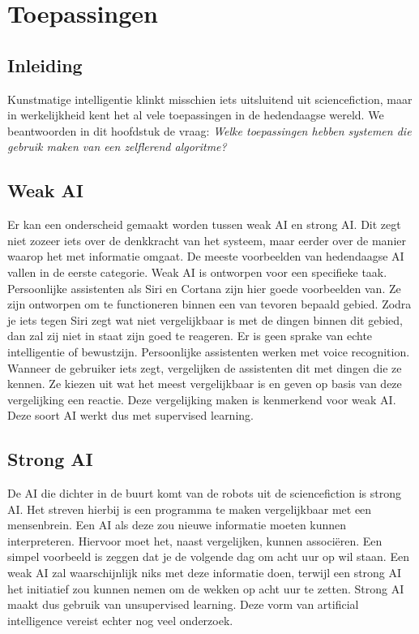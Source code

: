 \section{Toepassingen}

\subsection{Inleiding}
Kunstmatige intelligentie klinkt misschien iets uitsluitend uit sciencefiction, maar in werkelijkheid kent het al vele toepassingen in de hedendaagse wereld. We beantwoorden in dit hoofdstuk de vraag: \textit{Welke toepassingen hebben systemen die gebruik maken van een zelflerend algoritme?}

\subsection{Weak AI}
Er kan een onderscheid gemaakt worden tussen weak AI en strong AI. Dit zegt niet zozeer iets over de denkkracht van het systeem, maar eerder over de manier waarop het met informatie omgaat.
De meeste voorbeelden van hedendaagse AI vallen in de eerste categorie. Weak AI is ontworpen voor een specifieke taak. Persoonlijke assistenten als Siri en Cortana zijn hier goede voorbeelden van. Ze zijn ontworpen om te functioneren binnen een van tevoren bepaald gebied. Zodra je iets tegen Siri zegt wat niet vergelijkbaar is met de dingen binnen dit gebied, dan zal zij niet in staat zijn goed te reageren. Er is geen sprake van echte intelligentie of bewustzijn.
Persoonlijke assistenten werken met voice recognition. Wanneer de gebruiker iets zegt, vergelijken de assistenten dit met dingen die ze kennen. Ze kiezen uit wat het meest vergelijkbaar is en geven op basis van deze vergelijking een reactie. Deze vergelijking maken is kenmerkend voor weak AI. Deze soort AI werkt dus met supervised learning.

\subsection{Strong AI}
De AI die dichter in de buurt komt van de robots uit de sciencefiction is strong AI. Het streven hierbij is een programma te maken vergelijkbaar met een mensenbrein. \cite{Searle} Een AI als deze zou nieuwe informatie moeten kunnen interpreteren. Hiervoor moet het, naast vergelijken, kunnen associëren. Een simpel voorbeeld is zeggen dat je de volgende dag om acht uur op wil staan. Een weak AI zal waarschijnlijk niks met deze informatie doen, terwijl een strong AI het initiatief zou kunnen nemen om de wekken op acht uur te zetten. Strong AI maakt dus gebruik van unsupervised learning.
Deze vorm van artificial intelligence vereist echter nog veel onderzoek.

